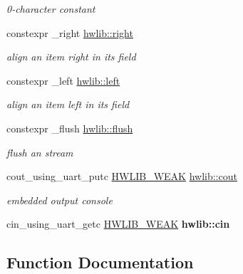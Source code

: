 \begin{DoxyCompactItemize}
\begin{DoxyCompactList}\small\item\em 0-\/character constant \end{DoxyCompactList}\item 
constexpr \+\_\+right \hyperlink{hwlib-ostream_01-_01_copy_8hpp_a26a6aead1d4dc1a990ab77bf2b730740}{hwlib\+::right}
\begin{DoxyCompactList}\small\item\em align an item right in its field \end{DoxyCompactList}\item 
constexpr \+\_\+left \hyperlink{hwlib-ostream_01-_01_copy_8hpp_a7d9a4ef3e66da75048c5b3e67cf401d8}{hwlib\+::left}
\begin{DoxyCompactList}\small\item\em align an item left in its field \end{DoxyCompactList}\item 
constexpr \+\_\+flush \hyperlink{hwlib-ostream_01-_01_copy_8hpp_a648fe94ca9899747a632c23f97007732}{hwlib\+::flush}
\begin{DoxyCompactList}\small\item\em flush an stream \end{DoxyCompactList}\item 
cout\+\_\+using\+\_\+uart\+\_\+putc \hyperlink{hwlib-defines_8hpp_a04be4340016df60d6636c1d1c6d94fc9}{H\+W\+L\+I\+B\+\_\+\+W\+E\+AK} \hyperlink{hwlib-ostream_01-_01_copy_8hpp_ac985c212834e4eb219aedede6efff2dc}{hwlib\+::cout}
\begin{DoxyCompactList}\small\item\em embedded output console \end{DoxyCompactList}\item 
cin\+\_\+using\+\_\+uart\+\_\+getc \hyperlink{hwlib-defines_8hpp_a04be4340016df60d6636c1d1c6d94fc9}{H\+W\+L\+I\+B\+\_\+\+W\+E\+AK} {\bfseries hwlib\+::cin}\hypertarget{hwlib-ostream_01-_01_copy_8hpp_a8f672f745fb7a27fe652c442779bd65d}{}\label{hwlib-ostream_01-_01_copy_8hpp_a8f672f745fb7a27fe652c442779bd65d}

\end{DoxyCompactItemize}


\subsection{Function Documentation}
